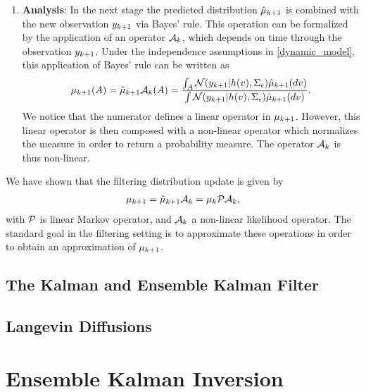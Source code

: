 \documentclass[12pt]{article}
\begin{document}
\begin{enumerate}
\item \textbf{Analysis}: In the next stage the predicted distribution $\predictMeas[\timeStep+1]$ is combined with the new observation $\ddataObs[\timeStep+1]$ via Bayes' rule.
This operation can be formalized by the application of an operator $\analysisOp$, which depends on time through the observation $\ddataObs[\timeStep+1]$. Under the independence 
assumptions in \ref{dynamic_model}, this application of Bayes' rule can be written as 
\begin{align*}
\filterMeas[\timeStep+1](A) = \predictMeas[\timeStep+1] \analysisOp(A) = \frac{\int_A \Gaussian(\ddataObs[\timeStep+1]|\obsOp(\state), \CovNoiseObs) \predictMeas[\timeStep+1](d\state)}{\int \Gaussian(\ddataObs[\timeStep+1]|\obsOp(\state), \CovNoiseObs) \predictMeas[\timeStep+1](d\state)}.
\end{align*}
We notice that the numerator defines a linear operator in $\filterMeas[\timeStep+1]$. However, this linear operator is then composed with a non-linear operator which normalizes the measure 
in order to return a probability measure. The operator $\analysisOp$ is thus non-linear. 
\end{enumerate}

We have shown that the filtering distribution update is given by 
\begin{align}
\filterMeas[\timeStep+1] = \predictMeas[\timeStep+1] \analysisOp = \filterMeas \predictOp \analysisOp,
\end{align}
with $\predictOp$ is linear Markov operator, and $\analysisOp$ a non-linear likelihood operator. The standard goal in the filtering setting is to approximate these operations in order 
to obtain an approximation of $\filterMeas[\timeStep+1]$. 

\subsection{The Kalman and Ensemble Kalman Filter}
\subsection{Langevin Diffusions}

\section{Ensemble Kalman Inversion}
\end{document}

